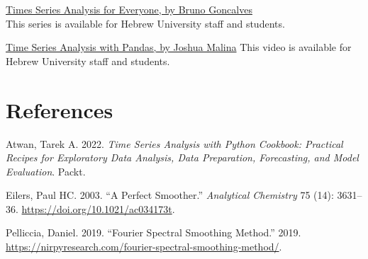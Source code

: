 \documentclass[
  letterpaper,
  DIV=11,
  numbers=noendperiod,
  oneside]{scrreprt}
\newlength{\cslhangindent}
\newlength{\cslentryspacingunit} %
\newenvironment{CSLReferences}[2] %
 {%
  \setlength{\parindent}{0pt}
  \ifodd #1
  \let\oldpar\par
  \def\par{\hangindent=\cslhangindent\oldpar}
  \fi
  \setlength{\parskip}{#2\cslentryspacingunit}
 }%
 {}
\begin{document}

\href{https://learning.oreilly.com/videos/times-series-analysis/9780136944515/}{Times
Series Analysis for Everyone, by Bruno Goncalves}\\
This series is available for Hebrew University staff and students.

\href{https://learning.oreilly.com/videos/time-series-analysis/00000G9DZPO7DJKE/}{Time
Series Analysis with Pandas, by Joshua Malina} This video is available
for Hebrew University staff and students.

\hypertarget{references}{%
\section*{References}\label{references}}


\hypertarget{refs}{}
\begin{CSLReferences}{1}{0}
\leavevmode{}%
Atwan, Tarek A. 2022. \emph{Time Series Analysis with Python Cookbook:
Practical Recipes for Exploratory Data Analysis, Data Preparation,
Forecasting, and Model Evaluation}. Packt.

\leavevmode{}%
Eilers, Paul HC. 2003. {``A Perfect Smoother.''} \emph{Analytical
Chemistry} 75 (14): 3631--36. \url{https://doi.org/10.1021/ac034173t}.

\leavevmode{}%
Pelliccia, Daniel. 2019. {``Fourier Spectral Smoothing Method.''} 2019.
\url{https://nirpyresearch.com/fourier-spectral-smoothing-method/}.

\end{CSLReferences}
\end{document}

